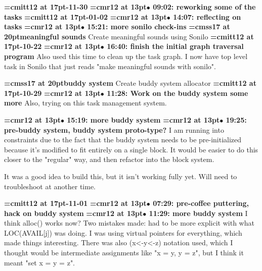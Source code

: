 {\medskip\noindent\bf\font\titlefont=cmitt12 at 17pt-11-30}\medskip
{\smallskip\noindent\bf\font\titlefont=cmr12 at 13pt\titlefont $\bullet$ 09:02: reworking some of the tasks}\smallskip
{\medskip\noindent\bf\font\titlefont=cmitt12 at 17pt-01-02}\medskip
{\smallskip\noindent\bf\font\titlefont=cmr12 at 13pt\titlefont $\bullet$ 14:07: reflecting on tasks}\smallskip
{\smallskip\noindent\bf\font\titlefont=cmr12 at 13pt\titlefont $\bullet$ 15:21: more sonilo check-ins}\smallskip
{}
{\medskip\noindent\bf\font\titlefont=cmss17 at 20pt\titlefont meaningful sounds}\medskip
Create meaningful sounds using Sonilo
{\medskip\noindent\bf\font\titlefont=cmitt12 at 17pt-10-22}\medskip
{\smallskip\noindent\bf\font\titlefont=cmr12 at 13pt\titlefont $\bullet$ 16:40: finish the initial graph traversal program}\smallskip
Also used this time to clean up the task graph. I now have top level task in Sonilo that just reads "make meaningful sounds with sonilo".
\par

{\medskip\noindent\bf\font\titlefont=cmss17 at 20pt\titlefont buddy system}\medskip
Create buddy system allocator
{\medskip\noindent\bf\font\titlefont=cmitt12 at 17pt-10-29}\medskip
{\smallskip\noindent\bf\font\titlefont=cmr12 at 13pt\titlefont $\bullet$ 11:28: Work on the buddy system some more}\smallskip
Also, trying on this task management system.
\par

{\smallskip\noindent\bf\font\titlefont=cmr12 at 13pt\titlefont $\bullet$ 15:19: more buddy system}\smallskip
{\smallskip\noindent\bf\font\titlefont=cmr12 at 13pt\titlefont $\bullet$ 19:25: pre-buddy system, buddy system proto-type?}\smallskip
I am running into constraints due to the fact that the buddy system needs to be pre-initialized because it's modified to fit entirely on a single block. It would be easier to do this closer to the "regular" way, and then refactor into the block system.
\par

It was a good idea to build this, but it isn't working fully yet. Will need to troubleshoot at another time.
\par

{\medskip\noindent\bf\font\titlefont=cmitt12 at 17pt-11-01}\medskip
{\smallskip\noindent\bf\font\titlefont=cmr12 at 13pt\titlefont $\bullet$ 07:29: pre-coffee puttering, hack on buddy system}\smallskip
{\smallskip\noindent\bf\font\titlefont=cmr12 at 13pt\titlefont $\bullet$ 11:29: more buddy system}\smallskip
I think alloc() works now? Two mistakes made: had to be more explicit with what LOC(AVAIL[j]) was doing. I was using virtual pointers for everything, which made things interesting. There was also (x<-y<-z) notation used, which I thought would be intermediate assignments like "x = y, y = z", but I think it meant "set x = y = z".
\par

